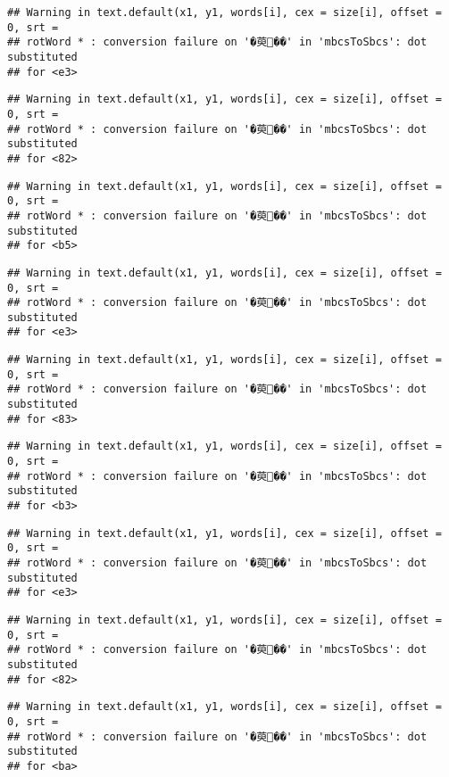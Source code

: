 \documentclass[]{article}
\begin{document}
\begin{verbatim}
## Warning in text.default(x1, y1, words[i], cex = size[i], offset = 0, srt =
## rotWord * : conversion failure on '�萸��' in 'mbcsToSbcs': dot substituted
## for <e3>
\end{verbatim}

\begin{verbatim}
## Warning in text.default(x1, y1, words[i], cex = size[i], offset = 0, srt =
## rotWord * : conversion failure on '�萸��' in 'mbcsToSbcs': dot substituted
## for <82>
\end{verbatim}

\begin{verbatim}
## Warning in text.default(x1, y1, words[i], cex = size[i], offset = 0, srt =
## rotWord * : conversion failure on '�萸��' in 'mbcsToSbcs': dot substituted
## for <b5>
\end{verbatim}

\begin{verbatim}
## Warning in text.default(x1, y1, words[i], cex = size[i], offset = 0, srt =
## rotWord * : conversion failure on '�萸��' in 'mbcsToSbcs': dot substituted
## for <e3>
\end{verbatim}

\begin{verbatim}
## Warning in text.default(x1, y1, words[i], cex = size[i], offset = 0, srt =
## rotWord * : conversion failure on '�萸��' in 'mbcsToSbcs': dot substituted
## for <83>
\end{verbatim}

\begin{verbatim}
## Warning in text.default(x1, y1, words[i], cex = size[i], offset = 0, srt =
## rotWord * : conversion failure on '�萸��' in 'mbcsToSbcs': dot substituted
## for <b3>
\end{verbatim}

\begin{verbatim}
## Warning in text.default(x1, y1, words[i], cex = size[i], offset = 0, srt =
## rotWord * : conversion failure on '�萸��' in 'mbcsToSbcs': dot substituted
## for <e3>
\end{verbatim}

\begin{verbatim}
## Warning in text.default(x1, y1, words[i], cex = size[i], offset = 0, srt =
## rotWord * : conversion failure on '�萸��' in 'mbcsToSbcs': dot substituted
## for <82>
\end{verbatim}

\begin{verbatim}
## Warning in text.default(x1, y1, words[i], cex = size[i], offset = 0, srt =
## rotWord * : conversion failure on '�萸��' in 'mbcsToSbcs': dot substituted
## for <ba>
\end{verbatim}
\end{document}
